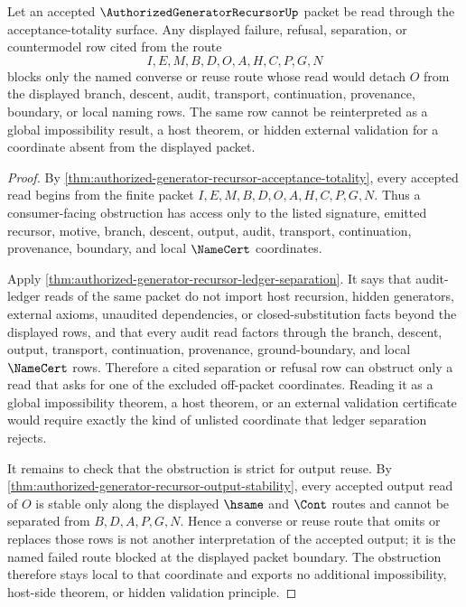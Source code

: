 \begin{corollary}
\label{cor:authorized-generator-recursor-acceptance-obstruction-locality}
Let an accepted $\AuthorizedGeneratorRecursorUp$ packet be read through the acceptance-totality surface. Any displayed failure, refusal, separation, or countermodel row cited from the route
$$
I,E,M,B,D,O,A,H,C,P,G,N
$$
blocks only the named converse or reuse route whose read would detach $O$ from the displayed branch, descent, audit, transport, continuation, provenance, boundary, or local naming rows. The same row cannot be reinterpreted as a global impossibility result, a host theorem, or hidden external validation for a coordinate absent from the displayed packet.
\end{corollary}
\begin{proof}
By \autoref{thm:authorized-generator-recursor-acceptance-totality}, every accepted read begins from the finite packet $I,E,M,B,D,O,A,H,C,P,G,N$. Thus a consumer-facing obstruction has access only to the listed signature, emitted recursor, motive, branch, descent, output, audit, transport, continuation, provenance, boundary, and local $\NameCert$ coordinates.

Apply \autoref{thm:authorized-generator-recursor-ledger-separation}. It says that audit-ledger reads of the same packet do not import host recursion, hidden generators, external axioms, unaudited dependencies, or closed-substitution facts beyond the displayed rows, and that every audit read factors through the branch, descent, output, transport, continuation, provenance, ground-boundary, and local $\NameCert$ rows. Therefore a cited separation or refusal row can obstruct only a read that asks for one of the excluded off-packet coordinates. Reading it as a global impossibility theorem, a host theorem, or an external validation certificate would require exactly the kind of unlisted coordinate that ledger separation rejects.

It remains to check that the obstruction is strict for output reuse. By \autoref{thm:authorized-generator-recursor-output-stability}, every accepted output read of $O$ is stable only along the displayed $\hsame$ and $\Cont$ routes and cannot be separated from $B,D,A,P,G,N$. Hence a converse or reuse route that omits or replaces those rows is not another interpretation of the accepted output; it is the named failed route blocked at the displayed packet boundary. The obstruction therefore stays local to that coordinate and exports no additional impossibility, host-side theorem, or hidden validation principle.
\end{proof}
